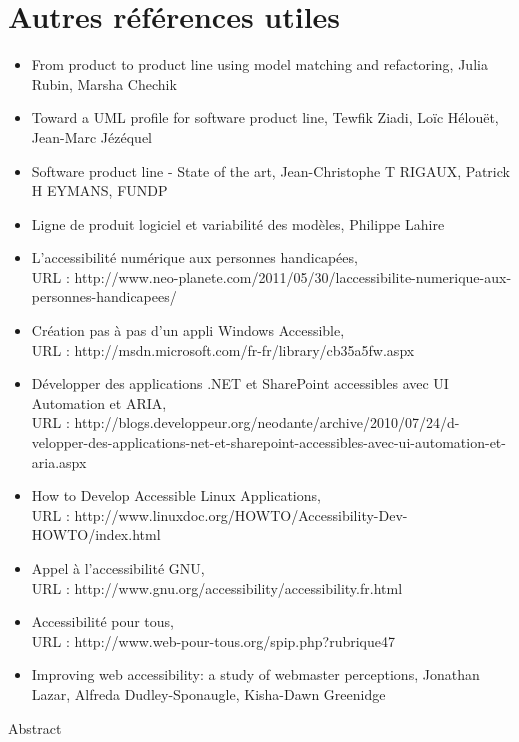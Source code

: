 \documentclass[french,a4paper]{report}
\begin{document}
{\section*{Autres références utiles}
\begin{itemize}\setlength{\itemsep}{0.4\baselineskip}
\item From product to product line using model matching and refactoring, Julia Rubin,
Marsha Chechik
\item Toward a UML profile for software product line, Tewfik Ziadi, Loïc Hélouët, Jean-Marc Jézéquel
\item Software product line - State of the art, Jean-Christophe T RIGAUX, Patrick H EYMANS, FUNDP
\item Ligne de produit logiciel et variabilité des modèles, Philippe Lahire
\item L’accessibilité numérique aux personnes handicapées,
\\ URL : http://www.neo-planete.com/2011/05/30/laccessibilite-numerique-aux-personnes-handicapees/
\item Création pas à pas d'un appli Windows Accessible,
\\URL : http://msdn.microsoft.com/fr-fr/library/cb35a5fw.aspx
\item Développer des applications .NET et SharePoint accessibles avec UI Automation et ARIA,
\\URL : http://blogs.developpeur.org/neodante/archive/2010/07/24/d-velopper-des-applications-net-et-sharepoint-accessibles-avec-ui-automation-et-aria.aspx
\item How to Develop Accessible Linux Applications,
\\URL : http://www.linuxdoc.org/HOWTO/Accessibility-Dev-HOWTO/index.html
\item Appel à l'accessibilité GNU,
\\URL : http://www.gnu.org/accessibility/accessibility.fr.html
\item Accessibilité pour tous,
\\URL : http://www.web-pour-tous.org/spip.php?rubrique47
\item Improving web accessibility: a study of webmaster perceptions, Jonathan Lazar,
Alfreda Dudley-Sponaugle, Kisha-Dawn Greenidge
\end{itemize}
\thispagestyle{plain}
\newpage
\thispagestyle{empty}
\clearpage
{}
\begin{center}
\Large Abstract
\end{center}
}
\end{document}
